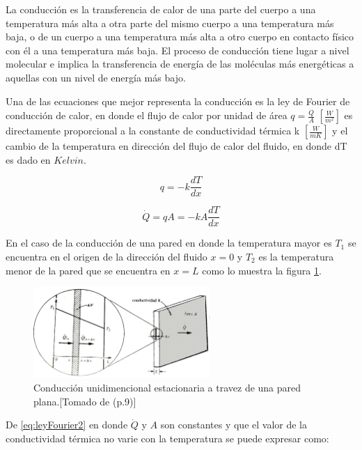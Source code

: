 \documentclass[12pt,letterpaper]{article}     %
\begin{document}
\cite[p\ 1-1-1]{Warren} La conducción es la transferencia de calor de una parte del cuerpo a una temperatura más alta a otra parte del mismo cuerpo a una temperatura más baja, o de un cuerpo a una temperatura más alta a otro cuerpo en contacto físico con él a una temperatura más baja. El proceso de conducción tiene lugar a nivel molecular e implica la transferencia de energía de las moléculas más energéticas a aquellas con un nivel de energía más bajo.

Una de las ecuaciones que mejor representa la conducción es la ley de Fourier de conducción de calor, en donde el flujo de calor por unidad de área $q = \frac{\dot{Q}}{A}$ $[\frac{W}{m^2}]$ es directamente proporcional a la constante de conductividad térmica k $[\frac{W}{mK}]$ y el cambio de la temperatura en dirección del flujo de calor del fluido, en donde dT es dado en $Kelvin$. 

\begin{equation}
    q = -k\frac{dT}{dx} 
    \label{eq:leyFourier1}
\end{equation}

\begin{equation}
    \dot{Q} = q A = -k A \frac{dT}{dx} 
    \label{eq:leyFourier2}
\end{equation}

En el caso de la conducción de una pared en donde la temperatura mayor es $T_{1}$ se encuentra en el origen de la dirección del fluido $x=0$ y $T_{2}$ es la temperatura menor de la pared que se encuentra en $x=L$ como lo muestra la figura \ref{fig:cond-paredplana}. 

\begin{figure}[H]
\centering
\includegraphics[width=0.6\textwidth]{Imagines/coduccion1pared-nuevo.jpg}
\caption{Conducción unidimencional estacionaria a travez de una pared plana.[Tomado de \cite{Mills} (p.9)]}
\label{fig:cond-paredplana}
\end{figure}

De \ref{eq:leyFourier2} en donde $\dot{Q}$ y $A$ son constantes y que el valor de la conductividad térmica no varie con la temperatura se puede expresar como:
\end{document}
